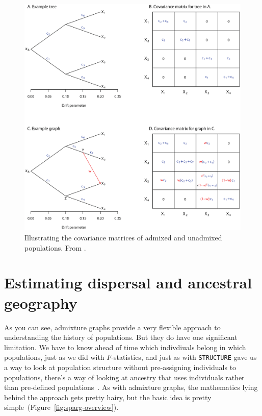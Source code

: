 \begin{figure}
  \begin{center}
    \includegraphics[width=14cm]{treemix-figure.eps}
  \end{center}
  \caption{Illustrating the covariance matrices of admixed and
    unadmixed populations. From \cite{Pickrell-Pritchard-2012}.}\label{fig:treemix-figure}
\end{figure}

\section*{Estimating dispersal and ancestral
  geography}

As you can see, admixture graphs provide a very flexible approach to
understanding the history of populations. But they do have one
significant limitation. We have to know ahead of time which
indivdiuals belong in which populations, just as we did with
$F$-statistics, and just as with
{\tt STRUCTURE} gave us a way to look at population structure without
pre-assigning individuals to populations, there's a way of looking at
ancestry that uses individuals rather than pre-defined
populations~\cite{Osmond-Coop-2021}. As with admixture graphs, the
mathematics lying behind the approach gets pretty hairy, but the basic
idea is pretty simple~(Figure~\ref{fig:sparg-overview}).

